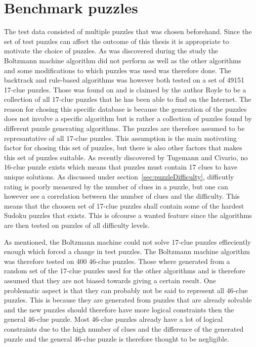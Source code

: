 \documentclass[a4paper,11pt]{kth-mag}
\begin{document}
\section{Benchmark puzzles}
\label{sec:benchmarkPuzzles}
The test data consisted of multiple puzzles that was chosen beforehand.
Since the set of test puzzles can affect the outcome of this thesis it is appropriate to motivate the choice of puzzles.
As was discovered during the study the Boltzmann machine algorithm did not perform as well as the other algorithms and some modifications to which puzzles was used was therefore done.
The backtrack and rule-based algorithms was however both tested on a set of 49151 17-clue puzzles. 
Those was found on \cite{database} and is claimed by the author Royle to be a collection of all 17-clue puzzles that he has been able to find on the Internet. 
The reason for chosing this specific database is because the generation of the puzzles does not involve a specific algorithm but is rather a collection of puzzles found by different puzzle generating algorithms.  
The puzzles are therefore assumed to be represantative of all 17-clue puzzles. 
This assumption is the main motivating factor for chosing this set of puzzles, but there is also other factors that makes this set of puzzles suitable. 
As recently discovered by Tugemann and Civario, no 16-clue puzzle exists which means that puzzles must contain 17 clues to have unique solutions.\cite{17clueProof}  
\label{sec:puzzleDifficulty}
As discussed under section~\ref{sec:puzzleDifficulty}, difficutly rating is poorly measured by the number of clues in a puzzle, but one can however see a correlation between the number of clues and the difficulty.\cite{difficulty}
This means that the choosen set of 17-clue puzzles shall contain some of the hardest Sudoku puzzles that exists.
This is ofcourse a wanted feature since the algorithms are then tested on puzzles of all difficulty levels.

As mentioned, the Boltzmann machine could not solve 17-clue puzzles effieciently enough which forced a change in test puzzles. The Boltzmann machine algorithm was therefore tested on 400 46-clue puzzles. Those where generated from a random set of the 17-clue puzzles used for the other algorithms and is therefore assumed that they are not biased towards giving a certain result.
One problematic aspect is that they can probably not be said to represent all 46-clue puzzles.
This is because they are generated from puzzles that are already solvable and the new puzzles should therefore have more logical constraints then the general 46-clue puzzle.
Most 46-clue puzzles already have a lot of logical constraints due to the high number of clues and the difference of the generated puzzle and the general 46-clue puzzle is therefore thought to be negligible.
\FloatBarrier
\end{document}
